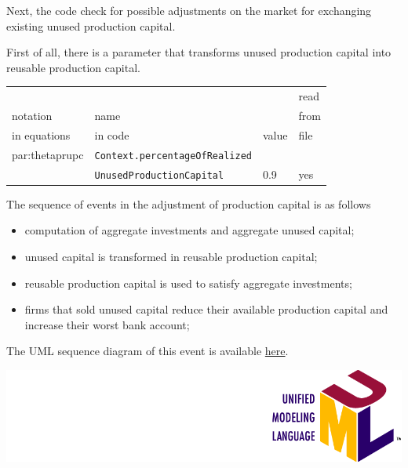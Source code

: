 \documentclass{book}
\newcommand{\doclocation}{file:///Users/giulioni/Documents/workspace/gabriele/docs}
\begin{document}

\vskip3mm
Next, the code check for possible adjustments on the market for exchanging existing unused production capital.

First of all, there is a parameter that transforms unused production capital into reusable production capital.

\vskip3mm
\noindent
\begin{tabular}{l l l l}
	\hline
	& &&read\\
	notation& name &&from\\
	in equations& in code&value&file\\
	\hline
	\hline
	\gls{par:thetaprupc}&\verb+Context.percentageOfRealized+&&\\
	&\hskip2cm \verb+UnusedProductionCapital+&0.9&yes\\
	\hline
\end{tabular}

\vskip3mm

The sequence of events in the adjustment of production capital is as follows
\begin{itemize}
	\item computation of aggregate investments and aggregate unused capital;
	\item unused capital is transformed in reusable production capital;
	\item reusable production capital is used to satisfy aggregate investments;
	\item firms that sold unused capital reduce their available production capital and increase their worst bank account;
\end{itemize}

\vskip3mm
The UML sequence diagram of this event is available \href{\doclocation/umldoc/computeInvestments.html}{here}.
\begin{marginfigure}
	\includegraphics[scale=0.1]{uml.png}
\end{marginfigure}
\vskip3mm

\iffalse
\end{document}
